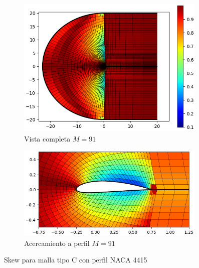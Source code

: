 \documentclass[letterpaper, openright, 12pt]{book}
\begin{document}
\begin{figure}[htbp!]
\begin{subfigure}[c]{0.48\textwidth}
            \includegraphics[keepaspectratio, width=0.99\textwidth]
                {./img/naca4415_c_m_91_skew_far}
            \caption{Vista completa $M = 91$}
            \label{fig:naca4415_c_m_91_skew_far}
        \end{subfigure}
        \hfill
        \begin{subfigure}[c]{0.48\textwidth}
            \includegraphics[keepaspectratio, width=0.99\textwidth]
                {./img/naca4415_c_m_91_skew_close}
            \caption{Acercamiento a perfil $M = 91$}
            \label{fig:naca4415_c_m_91_skew_close}
        \end{subfigure}
        \caption{Skew para malla tipo C con perfil NACA 4415}
        \label{fig:naca4415_c_skew_0}
    \end{figure}
\end{document}
